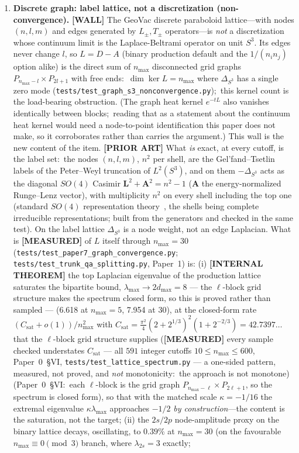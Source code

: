 \documentclass[aps,pra,twocolumn,superscriptaddress,longbibliography]{revtex4-2}
\newcommand{\gvq}[2]{#2}
\begin{document}
\begin{enumerate}
\item \textbf{Discrete graph: label lattice, not a discretization (non-convergence).} \textbf{[WALL]} The GeoVac discrete paraboloid lattice---with nodes $(n, l, m)$ and edges generated by $L_\pm, T_\pm$ operators---is \emph{not} a discretization whose continuum limit is the Laplace-Beltrami operator on unit $S^3$. Its edges never change $l$, so $L = D - A$ (binary production default and the $1/(n_i n_j)$ option alike) is the direct sum of $n_{\max}$ disconnected grid graphs $P_{n_{\max}-l} \times P_{2l+1}$ with free ends:\ $\dim\ker L = n_{\max}$ where $\Delta_{S^3}$ has a single zero mode (\texttt{tests/test\_graph\_s3\_nonconvergence.py});\ this kernel count is the load-bearing obstruction.  (The graph heat kernel $e^{-tL}$ also vanishes identically between blocks;\ reading that as a statement about the continuum heat kernel would need a node-to-point identification this paper does not make, so it corroborates rather than carries the argument.)  This wall is the new content of the item. \textbf{[PRIOR ART]} What \emph{is} exact, at every cutoff, is the label set:\ the nodes $(n, l, m)$, $n^2$ per shell, are the Gel'fand--Tsetlin labels of the Peter--Weyl truncation of $L^2(S^3)$, and on them $-\Delta_{S^3}$ acts as the diagonal $SO(4)$ Casimir $\mathbf{L}^2 + \mathbf{A}^2 = n^2 - 1$ ($\mathbf{A}$ the energy-normalized Runge--Lenz vector), with multiplicity $n^2$ on every shell including the top one (standard $SO(4)$ representation theory~\cite{pauli1926,bargmann1936}, the shells being complete irreducible representations; built from the generators and checked in the same test). On the label lattice $\Delta_{S^3}$ is a node weight, not an edge Laplacian. What is \textbf{[MEASURED]} of $L$ itself through $n_{\max} = 30$ (\texttt{tests/test\_paper7\_graph\_convergence.py}; \texttt{tests/test\_trunk\_qa\_splitting.py}, Paper~1) is: (i) \textbf{[INTERNAL THEOREM]} the top Laplacian eigenvalue of the production lattice saturates the bipartite bound, $\lambda_{\max} \to 2 d_{\max} = 8$ --- the $\ell$-block grid structure makes the spectrum closed form, so this is proved rather than sampled --- (6.618 at $n_{\max} = 5$, 7.954 at 30), at the closed-form rate $(C_{\mathrm{sat}} + o(1))/n_{\max}^2$ with $C_{\mathrm{sat}} = \tfrac{\pi^2}{4}(2+2^{1/3})^2(1+2^{-2/3}) = \gvq{saturation_c}{42.7397}\ldots$ that the $\ell$-block grid structure supplies (\textbf{[MEASURED]} every sample checked understates $C_{\mathrm{sat}}$ --- all $591$ integer cutoffs $10 \le n_{\max} \le 600$, Paper~0~\S VI, \texttt{tests/test\_lattice\_spectrum.py} --- a one-sided pattern, measured, not proved, and \emph{not} monotonicity:\ the approach is not monotone) (Paper~0~\S VI:\ each $\ell$-block is the grid graph $P_{n_{\max}-\ell} \times P_{2\ell+1}$, so the spectrum is closed form), so that with the matched scale $\kappa = -1/16$ the extremal eigenvalue $\kappa\lambda_{\max}$ approaches $-1/2$ \emph{by construction}---the content is the saturation, not the target; (ii) the $2s/2p$ node-amplitude proxy on the binary lattice decays, oscillating, to $0.39\%$ at $n_{\max} = 30$ (on the favourable $n_{\max} \equiv 0 \pmod 3$ branch, where $\lambda_{2s} = 3$ exactly;\ 
\end{enumerate}
\end{document}
